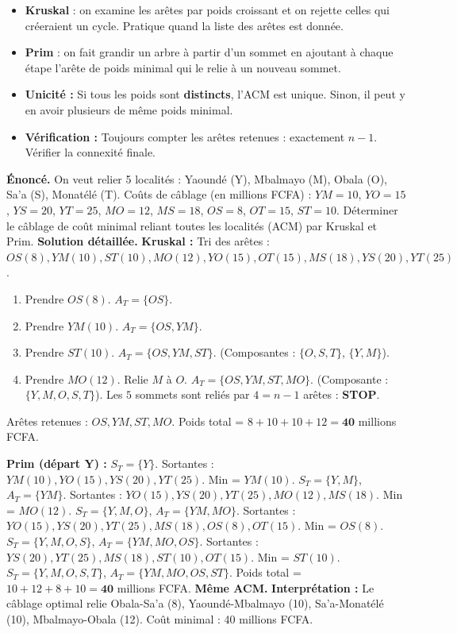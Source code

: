 \documentclass[11pt]{article}
\begin{document}
\begin{attention}
\begin{itemize}
  \item \textbf{Kruskal} : on examine les arêtes par poids croissant et on rejette celles qui créeraient un cycle. Pratique quand la liste des arêtes est donnée.
  \item \textbf{Prim} : on fait grandir un arbre à partir d'un sommet en ajoutant à chaque étape l'arête de poids minimal qui le relie à un nouveau sommet.
  \item \textbf{Unicité :} Si tous les poids sont \textbf{distincts}, l'ACM est unique. Sinon, il peut y en avoir plusieurs de même poids minimal.
  \item \textbf{Vérification :} Toujours compter les arêtes retenues : exactement $n-1$. Vérifier la connexité finale.
\end{itemize}
\end{attention}

\begin{exoresolu}
\textbf{Énoncé.} On veut relier 5 localités : Yaoundé (Y), Mbalmayo (M), Obala (O), Sa'a (S), Monatélé (T). Coûts de câblage (en millions FCFA) :
$YM=10$, $YO=15$, $YS=20$, $YT=25$, $MO=12$, $MS=18$, $OS=8$, $OT=15$, $ST=10$.
Déterminer le câblage de coût minimal reliant toutes les localités (ACM) par Kruskal et Prim.
\textbf{Solution détaillée.}
\tcblower
\textbf{Kruskal :} Tri des arêtes : $OS(8), YM(10), ST(10), MO(12), YO(15), OT(15), MS(18), YS(20), YT(25)$.
\begin{enumerate}
  \item Prendre $OS(8)$. $A_T=\{OS\}$.
  \item Prendre $YM(10)$. $A_T=\{OS, YM\}$.
  \item Prendre $ST(10)$. $A_T=\{OS, YM, ST\}$. (Composantes : $\{O,S,T\}$, $\{Y,M\}$).
  \item Prendre $MO(12)$. Relie $M$ à $O$. $A_T=\{OS, YM, ST, MO\}$. (Composante : $\{Y,M,O,S,T\}$). Les $5$ sommets sont reliés par $4 = n-1$ arêtes : \textbf{STOP}.
\end{enumerate}
Arêtes retenues : $OS, YM, ST, MO$. Poids total = $8+10+10+12 = \mathbf{40}$ millions FCFA.

\textbf{Prim (départ Y) :}
$S_T=\{Y\}$. Sortantes : $YM(10), YO(15), YS(20), YT(25)$. Min = $YM(10)$. $S_T=\{Y,M\}$, $A_T=\{YM\}$.
Sortantes : $YO(15), YS(20), YT(25), MO(12), MS(18)$. Min = $MO(12)$. $S_T=\{Y,M,O\}$, $A_T=\{YM, MO\}$.
Sortantes : $YO(15), YS(20), YT(25), MS(18), OS(8), OT(15)$. Min = $OS(8)$. $S_T=\{Y,M,O,S\}$, $A_T=\{YM, MO, OS\}$.
Sortantes : $YS(20), YT(25), MS(18), ST(10), OT(15)$. Min = $ST(10)$. $S_T=\{Y,M,O,S,T\}$, $A_T=\{YM, MO, OS, ST\}$.
Poids total = $10+12+8+10 = \mathbf{40}$ millions FCFA. \textbf{Même ACM.}
\textbf{Interprétation :} Le câblage optimal relie Obala-Sa'a (8), Yaoundé-Mbalmayo (10), Sa'a-Monatélé (10), Mbalmayo-Obala (12). Coût minimal : 40 millions FCFA.
\end{exoresolu}
\end{document}
